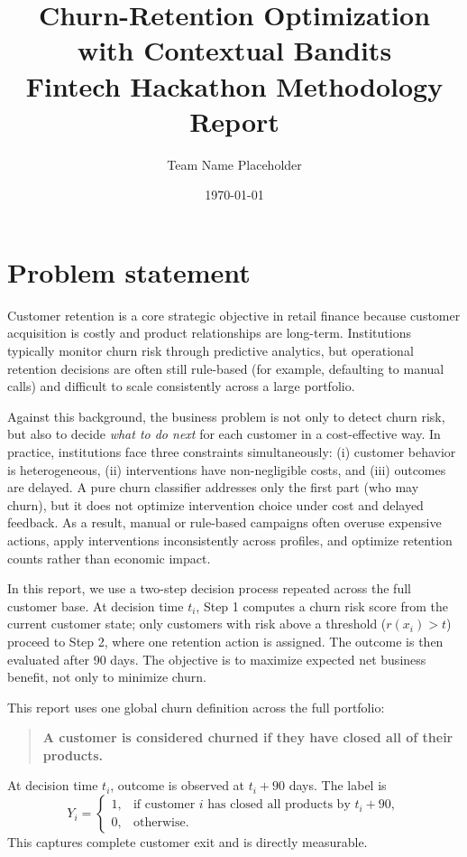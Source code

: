 \documentclass[11pt,a4paper]{article}
\title{Churn-Retention Optimization with Contextual Bandits\\
\large Fintech Hackathon Methodology Report}
\author{Team Name Placeholder}
\date{\today}
\begin{document}
\maketitle

\section{Problem statement}
Customer retention is a core strategic objective in retail finance because customer acquisition is costly and product relationships are long-term. Institutions typically monitor churn risk through predictive analytics, but operational retention decisions are often still rule-based (for example, defaulting to manual calls) and difficult to scale consistently across a large portfolio.

Against this background, the business problem is not only to detect churn risk, but also to decide \emph{what to do next} for each customer in a cost-effective way. In practice, institutions face three constraints simultaneously: (i) customer behavior is heterogeneous, (ii) interventions have non-negligible costs, and (iii) outcomes are delayed. A pure churn classifier addresses only the first part (who may churn), but it does not optimize intervention choice under cost and delayed feedback. As a result, manual or rule-based campaigns often overuse expensive actions, apply interventions inconsistently across profiles, and optimize retention counts rather than economic impact.

In this report, we use a two-step decision process repeated across the full customer base. At decision time $t_i$, Step 1 computes a churn risk score from the current customer state; only customers with risk above a threshold ($r(x_i)>t$) proceed to Step 2, where one retention action is assigned. The outcome is then evaluated after 90 days. The objective is to maximize expected net business benefit, not only to minimize churn.

This report uses one global churn definition across the full portfolio:
\begin{quote}
\textbf{A customer is considered churned if they have closed all of their products.}
\end{quote}

At decision time $t_i$, outcome is observed at $t_i+90$ days. The label is
\[
Y_i=
\begin{cases}
1, & \text{if customer } i \text{ has closed all products by } t_i+90,\\
0, & \text{otherwise.}
\end{cases}
\]
This captures complete customer exit and is directly measurable.
\end{document}
